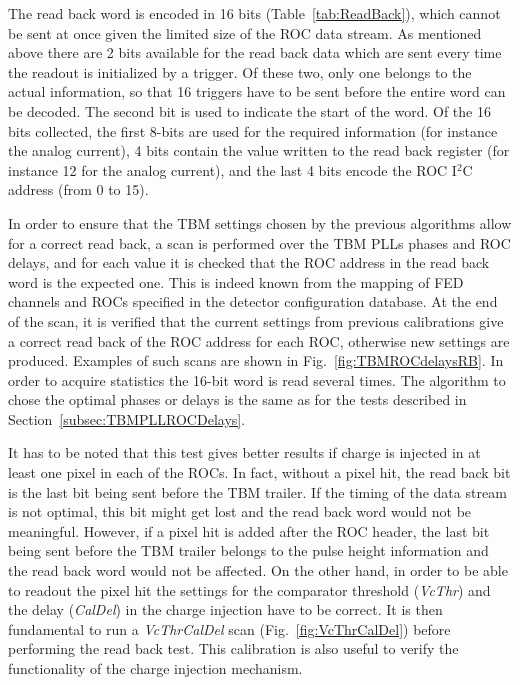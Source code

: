 The read back word is encoded in 16 bits (Table~\ref{tab:ReadBack}), which cannot be sent at once given the limited size of the ROC data stream.
As mentioned above there are 2 bits available for the read back data which are sent every time the readout is initialized by a trigger.
Of these two, only one belongs to the actual information, so that 16 triggers have to be sent before the entire word can be decoded.
The second bit is used to indicate the start of the word.
Of the 16 bits collected, the first 8-bits are used for the required information (for instance the analog current),
4 bits contain the value written to the read back register (for instance 12 for the analog current),
and the last 4 bits encode the ROC I$^2$C address (from 0 to 15).

In order to ensure that the TBM settings chosen by the previous algorithms allow for a correct read back,
a scan is performed over the TBM PLLs phases and ROC delays,
and for each value it is checked that the ROC address in the read back word is the expected one.
This is indeed known from the mapping of FED channels and ROCs specified in the detector configuration database.
At the end of the scan, it is verified that the current settings from previous calibrations give a correct read back of the ROC address for each ROC, otherwise new settings are produced.
Examples of such scans are shown in Fig.~\ref{fig:TBMROCdelaysRB}.
In order to acquire statistics the 16-bit word is read several times.
The algorithm to chose the optimal phases or delays is the same as for the tests described in Section~\ref{subsec:TBMPLLROCDelays}.

It has to be noted that this test gives better results if charge is injected in at least one pixel in each of the ROCs.
In fact, without a pixel hit, the read back bit is the last bit being sent before the TBM trailer.
If the timing of the data stream is not optimal, this bit might get lost and the read back word would not be meaningful.
However, if a pixel hit is added after the ROC header, the last bit being sent before the TBM trailer belongs to the pulse height information and the read back word would not be affected.
On the other hand, in order to be able to readout the pixel hit the settings for the comparator threshold (\textit{VcThr}) and the delay (\textit{CalDel}) in the charge injection have to be correct.
It is then fundamental to run a \textit{VcThrCalDel} scan (Fig.~\ref{fig:VcThrCalDel}) before performing the read back test.
This calibration is also useful to verify the functionality of the charge injection mechanism.

